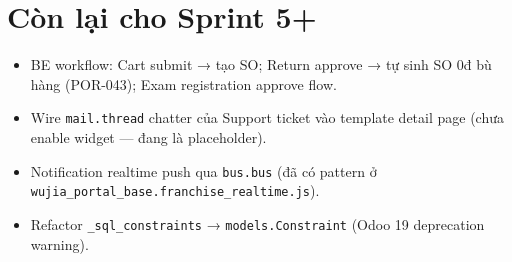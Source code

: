 \section{Còn lại cho Sprint 5+}

\begin{itemize}
    \item BE workflow: Cart submit → tạo SO; Return approve → tự sinh SO 0đ bù hàng (POR-043); Exam registration approve flow.
    \item Wire \texttt{mail.thread} chatter của Support ticket vào template detail page (chưa enable widget — đang là placeholder).
    \item Notification realtime push qua \texttt{bus.bus} (đã có pattern ở \texttt{wujia\_portal\_base.franchise\_realtime.js}).
    \item Refactor \texttt{\_sql\_constraints} → \texttt{models.Constraint} (Odoo 19 deprecation warning).
\end{itemize}

